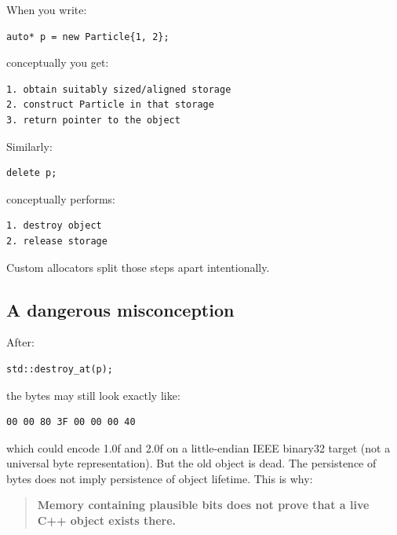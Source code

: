 \hypertarget{05-engine-i-ch002-new-actually-combines-operations}{}

When you write:

\begin{verbatim}
auto* p = new Particle{1, 2};
\end{verbatim}

conceptually you get:

\begin{verbatim}
1. obtain suitably sized/aligned storage
2. construct Particle in that storage
3. return pointer to the object
\end{verbatim}

Similarly:

\begin{verbatim}
delete p;
\end{verbatim}

conceptually performs:

\begin{verbatim}
1. destroy object
2. release storage
\end{verbatim}

Custom allocators split those steps apart intentionally.

\subsection{A dangerous misconception}\label{05-engine-i-ch002-a-dangerous-misconception}

\hypertarget{05-engine-i-ch002-a-dangerous-misconception}{}

After:

\begin{verbatim}
std::destroy_at(p);
\end{verbatim}

the bytes may still look exactly like:

\begin{verbatim}
00 00 80 3F 00 00 00 40
\end{verbatim}

which could encode 1.0f and 2.0f on a little-endian IEEE binary32 target (not a universal byte representation). But the old  object is dead. The persistence of bytes does not imply persistence of object lifetime. This is why:

\begin{quote}
\textbf{Memory containing plausible bits does not prove that a live C++ object exists there.}
\end{quote}

